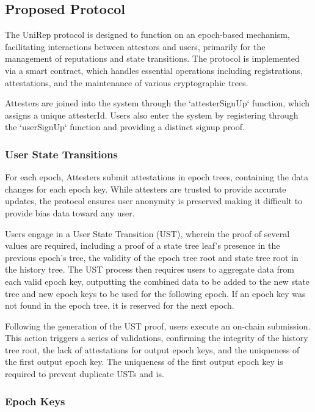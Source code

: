 \documentclass[11pt]{article}
\begin{document}
\subsection{Proposed Protocol}
\label{sec:orgfa9e7fa}

The UniRep protocol is designed to function on an epoch-based mechanism, facilitating interactions between attestors and users, primarily for the management of reputations and state transitions. The protocol is implemented via a smart contract, which handles essential operations including registrations, attestations, and the maintenance of various cryptographic trees.

Attesters are joined into the system through the `attesterSignUp` function, which assigns a unique attesterId. Users also enter the system by registering through the `userSignUp` function and providing a distinct signup proof.
\subsubsection{User State Transitions}
\label{sec:org2235809}

For each epoch, Attesters submit attestations in epoch trees, containing the data changes for each epoch key. While attesters are trusted to provide accurate updates, the protocol ensures user anonymity is preserved making it difficult to provide bias data toward any user.

Users engage in a User State Transition (UST), wherein the proof of several values are required, including a proof of a state tree leaf's presence in the previous epoch's tree, the validity of the epoch tree root and state tree root in the history tree. The UST process then requires users to aggregate data from each valid epoch key, outputting the combined data to be added to the new state tree and new epoch keys to be used for the following epoch. If an epoch key was not found in the epoch tree, it is reserved for the next epoch.

Following the generation of the UST proof, users execute an on-chain submission. This action triggers a series of validations, confirming the integrity of the history tree root, the lack of attestations for output epoch keys, and the uniqueness of the first output epoch key. The uniqueness of the first output epoch key is required to prevent duplicate USTs and is.
\subsubsection{Epoch Keys}
\label{sec:orgf9a2097}
\end{document}
